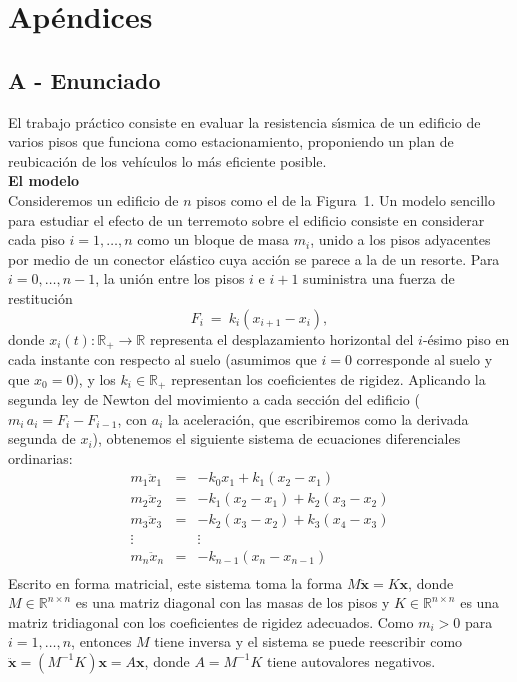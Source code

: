 \documentclass[a4paper]{article}
\begin{document}
\newpage

\section{Apéndices}
\subsection{A - Enunciado}

El trabajo pr\'actico consiste en evaluar la resistencia s\'\i smica de un
edificio de varios pisos que funciona como estacionamiento, proponiendo un plan de
reubicaci\'on de los veh\'iculos lo m\'as eficiente posible.\\

\textbf{El modelo}\\
Consideremos un edificio de $n$ pisos como el de la Figura~1. Un modelo sencillo
para estudiar el efecto de un terremoto sobre el edificio consiste en
considerar cada piso $i=1,\dots,n$ como un bloque de masa $m_i$, unido a los
pisos adyacentes por medio de un conector el\'astico cuya acci\'on se parece
a la de un resorte. Para $i=0,\dots,n-1$, la uni\'on entre los pisos $i$ e
$i+1$ suministra una fuerza de restituci\'on
\begin{displaymath}
F_i\ =\ k_i (x_{i+1}-x_i),
\end{displaymath}
donde $x_i(t)\colon \mathbb{R}_+ \rightarrow \mathbb{R}$ representa el desplazamiento
horizontal del $i$-\'esimo piso en cada instante con respecto al suelo (asumimos que $i=0$ corresponde
al suelo y que $x_0=0$), y los $k_i\in\mathbb{R}_+$ representan los coeficientes
de rigidez. Aplicando la segunda ley de Newton del movimiento %
a cada secci\'on del edificio ($m_i\, a_i = F_i-F_{i-1}$, con $a_i$ la aceleraci\'on, que escribiremos como la derivada segunda de $x_i$), 
obtenemos el siguiente sistema de ecuaciones diferenciales ordinarias:
\begin{eqnarray*}
m_1 \ddot{x}_1 & = & -k_0 x_1 + k_1 (x_2-x_1) \nonumber \\
m_2 \ddot{x}_2 & = & -k_1 (x_2-x_1) + k_2 (x_3-x_2) \nonumber \\
m_3 \ddot{x}_3 & = & -k_2 (x_3-x_2) + k_3 (x_4-x_3) \nonumber \\
\vdots &  & \vdots \nonumber \\
m_n \ddot{x}_n & = & -k_{n-1} (x_n-x_{n-1}) \nonumber \\
\end{eqnarray*}
Escrito en forma matricial, este
sistema toma la forma $M\ddot{\mathbf{x}} = K\mathbf{x}$, 
donde $M\in\mathbb{R}^{n\times n}$ es una matriz
diagonal con las masas de los pisos y $K\in\mathbb{R}^{n\times n}$ es una matriz
tridiagonal con los coeficientes de rigidez adecuados. Como $m_i>0$ para
$i=1,\dots,n$, entonces $M$ tiene inversa y el sistema se puede reescribir
como $\ddot{\mathbf{x}} = (M^{-1} K) \mathbf{x} = A\mathbf{x}$, donde $A = M^{-1} K$ tiene autovalores negativos.
\end{document}
